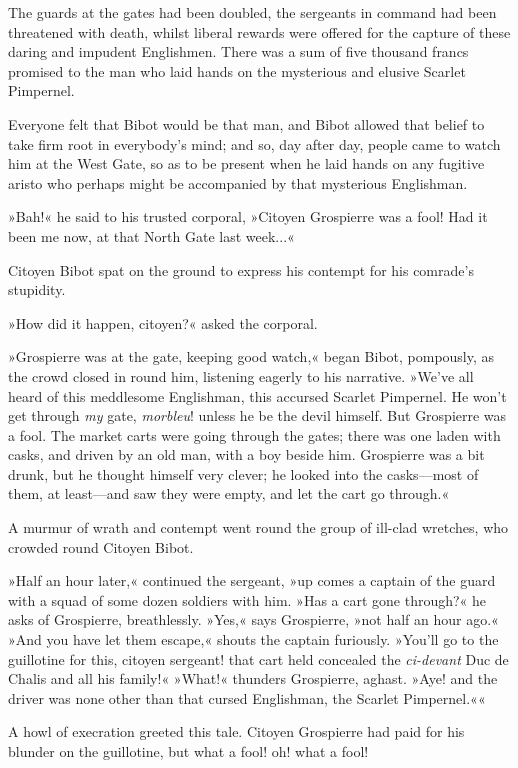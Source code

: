 The guards at the gates had been doubled, the sergeants in command had been threatened with death, whilst liberal rewards were offered for the capture of these daring and impudent Englishmen. There was a sum of five thousand francs promised to the man who laid hands on the mysterious and elusive Scarlet Pimpernel.

Everyone felt that Bibot would be that man, and Bibot allowed that belief to take firm root in everybody's mind; and so, day after day, people came to watch him at the West Gate, so as to be present when he laid hands on any fugitive aristo who perhaps might be accompanied by that mysterious Englishman.

»Bah!« he said to his trusted corporal, »Citoyen Grospierre was a fool! Had it been me now, at that North Gate last week...«

Citoyen Bibot spat on the ground to express his contempt for his comrade's stupidity.

»How did it happen, citoyen?« asked the corporal.

»Grospierre was at the gate, keeping good watch,« began Bibot, pompously, as the crowd closed in round him, listening eagerly to his narrative. »We've all heard of this meddlesome Englishman, this accursed Scarlet Pimpernel. He won't get through \textit{my} gate, \textit{morbleu}! unless he be the devil himself. But Grospierre was a fool. The market carts were going through the gates; there was one laden with casks, and driven by an old man, with a boy beside him. Grospierre was a bit drunk, but he thought himself very clever; he looked into the casks\allowbreak---\allowbreak most of them, at least\allowbreak---\allowbreak and saw they were empty, and let the cart go through.«

A murmur of wrath and contempt went round the group of ill-clad wretches, who crowded round Citoyen Bibot.

»Half an hour later,« continued the sergeant, »up comes a captain of the guard with a squad of some dozen soldiers with him. »Has a cart gone through?« he asks of Grospierre, breathlessly. »Yes,« says Grospierre, »not half an hour ago.« »And you have let them escape,« shouts the captain furiously. »You'll go to the guillotine for this, citoyen sergeant! that cart held concealed the \textit{ci-devant} Duc de Chalis and all his family!« »What!« thunders Grospierre, aghast. »Aye! and the driver was none other than that cursed Englishman, the Scarlet Pimpernel.««

A howl of execration greeted this tale. Citoyen Grospierre had paid for his blunder on the guillotine, but what a fool! oh! what a fool!

